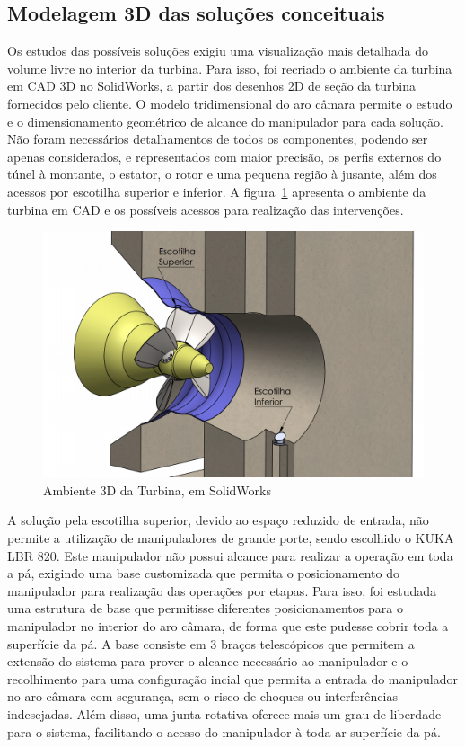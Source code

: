 \subsection{Modelagem 3D das soluções conceituais}
Os estudos das possíveis soluções exigiu uma visualização mais detalhada do
volume livre no interior da turbina. Para isso, foi recriado o ambiente da
turbina em CAD 3D no SolidWorks, a partir dos desenhos 2D de seção da turbina
fornecidos pelo cliente.
O modelo tridimensional do aro câmara permite o estudo e o dimensionamento geométrico de
alcance do manipulador para cada solução. Não foram necessários
detalhamentos de todos os componentes, podendo ser apenas considerados, e
representados com maior precisão, os perfis externos do túnel à montante, o
estator, o rotor e uma pequena região à jusante, além dos acessos
por escotilha superior e inferior.
A figura~\ref{fig::ambiente3d} apresenta o ambiente da turbina em CAD e os
possíveis acessos para realização das intervenções.

\begin{figure}[h!]
\centering
	\includegraphics[width=\columnwidth]{figs/estudo/solid/ambiente_3d} 
	\caption{Ambiente 3D da Turbina, em SolidWorks}
	\label{fig::ambiente3d}
\end{figure}

A solução pela escotilha superior, devido ao espaço reduzido de entrada, não
permite a utilização de manipuladores de grande porte, sendo escolhido o KUKA
LBR 820. Este manipulador não possui alcance para realizar a operação em toda a
pá, exigindo uma base customizada que permita o
posicionamento do manipulador para realização das operações por etapas. Para
isso, foi estudada uma estrutura de base que permitisse diferentes
posicionamentos para o manipulador no interior do aro câmara, de forma que este
pudesse cobrir toda a superfície da pá. A base consiste em 3 braços
telescópicos que permitem a extensão do sistema para prover o alcance
necessário ao manipulador e o recolhimento para uma configuração incial que
permita a entrada do manipulador no aro câmara com segurança, sem o risco de
choques ou interferências indesejadas. Além disso, uma junta rotativa oferece mais um grau
de liberdade para o sistema, facilitando o acesso do manipulador à toda ar
superfície da pá. 

